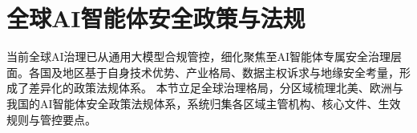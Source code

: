 

\section{全球AI智能体安全政策与法规}
当前全球AI治理已从通用大模型合规管控，细化聚焦至AI智能体专属安全治理层面。各国及地区基于自身技术优势、产业格局、数据主权诉求与地缘安全考量，形成了差异化的政策法规体系。
%
本节立足全球治理格局，分区域梳理北美、欧洲与我国的AI智能体安全政策法规体系，系统归集各区域主管机构、核心文件、生效规则与管控要点。


